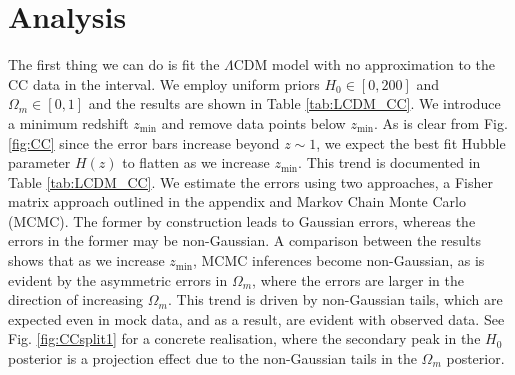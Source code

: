 \documentclass[aps,prl,10pt,twocolumn,superscriptaddress, nofootinbib]{revtex4}
\begin{document}
\section{Analysis}
The first thing we can do is fit the $\Lambda$CDM model with no approximation to the CC data in the interval. We employ uniform priors $H_0 \in [0, 200]$ and $\Omega_m \in [0, 1]$ and the results are shown in Table \ref{tab:LCDM_CC}. We introduce a minimum redshift $z_{\textrm{min}}$ and remove data points below $z_{\textrm{min}}$. As is clear from Fig. \ref{fig:CC} since the error bars increase beyond $z \sim 1$, we expect the best fit Hubble parameter $H(z)$ to flatten as we increase $z_{\textrm{min}}$. This trend is documented in Table \ref{tab:LCDM_CC}. We estimate the errors using two approaches, a Fisher matrix approach outlined in the appendix and Markov Chain Monte Carlo (MCMC). The former by construction leads to Gaussian errors, whereas the errors in the former may be non-Gaussian. A comparison between the results shows that as we increase $z_{\textrm{min}}$, MCMC inferences become non-Gaussian, as is evident by the asymmetric errors in $\Omega_m$, where the errors are larger in the direction of increasing $\Omega_m$. This trend is driven by non-Gaussian tails, which are expected even in mock data, and as a result, are evident with observed data. See Fig. \ref{fig:CCsplit1} for a concrete realisation, where the secondary peak in the $H_0$ posterior is a projection effect due to the non-Gaussian tails in the $\Omega_m$ posterior.  
\end{document}
